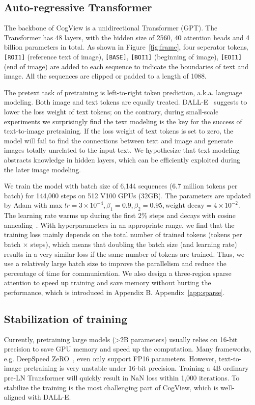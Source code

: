 \subsection{Auto-regressive Transformer}

The backbone of CogView is a unidirectional Transformer (GPT). The Transformer has 48 layers, with the hidden size of 2560, 40 attention heads and 4 billion parameters in total. As shown in Figure~\ref{fig:frame}, four seperator tokens, \texttt{[ROI1]} (reference text of image), \texttt{[BASE]}, \texttt{[BOI1]} (beginning of image), \texttt{[EOI1]} (end of image) are added to each sequence to indicate the boundaries of text and image. All the sequences are clipped or padded to a length of 1088.

The pretext task of pretraining is left-to-right token prediction, a.k.a. language modeling. Both image and text tokens are equally treated. DALL-E~\cite{ramesh2021zero} suggests to lower the loss weight of text tokens; on the contrary, during small-scale experiments we surprisingly find the text modeling is the key for the success of text-to-image pretraining. If the loss weight of text tokens is set to zero, the model will fail to find the connections between text and image and generate images totally unrelated to the input text. We hypothesize that text modeling abstracts knowledge in hidden layers, which can be efficiently exploited during the later image modeling. 

We train the model with batch size of 6,144 sequences (6.7 million tokens per batch) for 144,000 steps on 512 V100 GPUs (32GB). The parameters are updated by Adam with max 
$lr=3\times 10^{-4}, \beta_1=0.9, \beta_2=0.95, \text{weight decay}=4\times 10^{-2}$. The learning rate warms up during the first 2\% steps and decays with cosine annealing~\cite{loshchilov2016sgdr}. With hyperparameters in an appropriate range, we find that the training loss mainly depends on the total number of trained tokens (tokens per batch $\times$ steps), which means that doubling the batch size (and learning rate) results in a very similar loss if the same number of tokens are trained. Thus, we use a relatively large batch size to improve the parallelism and reduce the percentage of time for communication. We also design a three-region sparse attention to speed up training and save memory without hurting the performance, which is introduced in \ifblind Appendix B. \else Appendix~\ref{app:sparse}.\fi

\subsection{Stabilization of training}\label{sec:stable}
Currently, pretraining large models (>2B parameters) usually relies on 16-bit precision to save GPU memory and speed up the computation. Many frameworks, e.g. DeepSpeed ZeRO~\cite{rasley2020deepspeed}, even only support FP16 parameters. However, text-to-image pretraining is very unstable under 16-bit precision. Training a 4B ordinary pre-LN Transformer will quickly result in NaN loss within 1,000 iterations. To stabilize the training is the most challenging part of CogView, which is well-aligned with DALL-E.  

